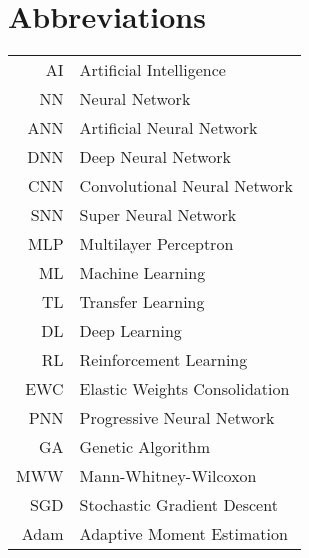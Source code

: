 \chapter*{Abbreviations}
\begin{table}[h]
    \centering
    \begin{tabular}{r|l}
    
AI     & Artificial Intelligence\\
NN     & Neural Network\\
ANN    & Artificial Neural Network\\
DNN    & Deep Neural Network\\
CNN    & Convolutional Neural Network\\
SNN    & Super Neural Network\\
MLP    & Multilayer Perceptron\\
ML     & Machine Learning\\
TL     & Transfer Learning\\
DL     & Deep Learning\\
RL     & Reinforcement Learning\\
EWC    & Elastic Weights Consolidation\\
PNN    & Progressive Neural Network\\
GA     & Genetic Algorithm\\
MWW    & Mann-Whitney-Wilcoxon\\
SGD    & Stochastic Gradient Descent\\
Adam   & Adaptive Moment Estimation
    \end{tabular}
\end{table}


